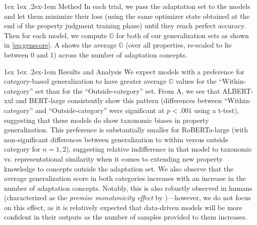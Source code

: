 \documentclass[10pt,letterpaper]{article}
\makeatletter
\renewcommand{\paragraph}{%
  \@startsection{paragraph}{4}%
  {\z@}{1ex \@plus 1ex \@minus .2ex}{-1em}%
  {\normalfont\normalsize\bfseries}%
}
\makeatother
\begin{document}
\paragraph{Method}
In each trial, we pass the adaptation set to the models and let them minimize their loss (using the same optimizer state obtained at the end of the property judgment training phase) until they reach perfect accuracy. Then for each model, we compute $\mathbb{G}$ for both of our generalization sets as shown in \cref{eq:genscore}. 
A shows the average $\mathbb{G}$ (over all properties, re-scaled to lie between 0 and 1) across the number of adaptation concepts.

\paragraph{Results and Analysis}
We expect models with a preference for category-based generalization to have greater average $\mathbb{G}$ values for the ``Within-category'' set than for the ``Outside-category'' set.
From A, we see that ALBERT-xxl and BERT-large consistently 
show this pattern (differences between ``Within-category'' and ``Outside-category'' were significant at $p<.001$ using a t-test), suggesting that these models do show taxonomic biases in property generalization. This preference is substantially smaller for RoBERTa-large (with non-significant differences between generalization to within versus outside category for $n=1,2$), suggesting relative indifference in that model to taxonomic vs. representational similarity when it comes to extending new property knowledge to concepts outside the adaptation set.
We also observe that the average generalization score in both categories increases with an increase in the number of adaptation concepts. Notably, this is also robustly observed in humans (characterized as the \textit{premise monotonicity effect} by \citeauthor{osherson1990category})---however, we do not focus on this effect, as it is relatively expected that data-driven models will be more confident in their outputs as the number of samples provided to them increases.
\end{document}
